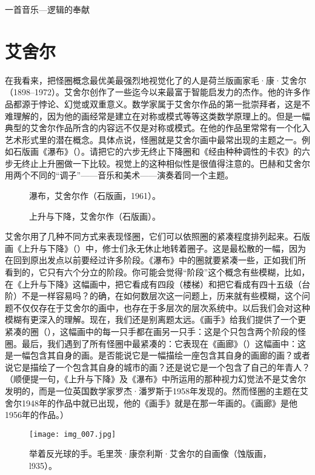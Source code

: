 \begin{intro}{一首音乐—逻辑的奉献}
\section{艾舍尔}

在我看来，把怪圈概念最优美最强烈地视觉化了的人是荷兰版画家毛·康·艾舍尔（1898--1972）。艾舍尔创作了一些迄今以来最富于智能启发力的杰作。他的许多作品都源于悖论、幻觉或双重意义。数学家属于艾舍尔作品的第一批崇拜者，这是不难理解的，因为他的画经常是建立在对称或模式等等这类数学原理上的。但是一幅典型的艾舍尔作品所含的内容远不仅是对称或模式。在他的作品里常常有一个化入艺术形式里的潜在概念。具体点说，怪圈就是艾舍尔画中最常出现的主题之一。例如石版画《瀑布》（）。请把它的六步无终止下降圈和《经由种种调性的卡农》的六步无终止上升圈做一下比较。视觉上的这种相似性是很值得注意的。巴赫和艾舍尔用两个不同的“调子”——音乐和美术——演奏着同一个主题。

\begin{sidewaysfigure}
\begin{floatrow}
          {\caption[瀑布，艾舍尔作。]{瀑布，艾舍尔作（石版画，1961）。}}
          {\caption[上升与下降，艾舍尔作。]{上升与下降，艾舍尔作（石版画）。}}
\end{floatrow}
\end{sidewaysfigure}

艾舍尔用了几种不同方式来表现怪圈，它们可以依照圈的紧凑程度排列起来。石版画《上升与下降》（）中，修士们永无休止地转着圈子。这是最松散的一幅，因为在回到原出发点以前要经过许多阶段。《瀑布》中的圈就要紧凑一些，正如我们所看到的，它只有六个分立的阶段。你可能会觉得“阶段”这个概念有些模糊，比如，在《上升与下降》这幅画中，把它看成有四段（楼梯）和把它看成有四十五级（台阶）不是一样容易吗？的确，在如何数层次这一问题上，历来就有些模糊，这个问题不仅仅存在于艾舍尔的画中，也存在于多层次的层次系统中。以后我们会对这种模糊有更深入的理解。现在，我们还是别离题太远。《画手》给我们提供了一个更紧凑的圈（），这幅画中的每一只手都在画另一只手：这是个只包含两个阶段的怪圈。最后，我们遇到了所有怪圈中最紧凑的：它表现在《画廊》（）这幅画中：这是一幅包含其自身的画。是否能说它是一幅描绘一座包含其自身的画廊的画？或者说它是描绘了一个包含其自身的城市的画？还是说它是一个包含了自己的年青人？（顺便提一句，《上升与下降》及《瀑布》中所运用的那种视力幻觉法不是艾舍尔发明的，而是一位英国数学家罗杰·潘罗斯于1958年发现的。然而怪圈的主题在艾舍尔1948年的作品中就已出现，他的《画手》就是在那一年画的。《画廊》是他1956年的作品。）

\begin{figure}
\texttt{[image: img\_007.jpg]}
\caption[拿着反光球的手，艾舍尔作。]
  {举着反光球的手。毛里茨·康奈利斯·艾舍尔的自画像（蚀版画，l935）。}
\end{figure}


\end{intro}
